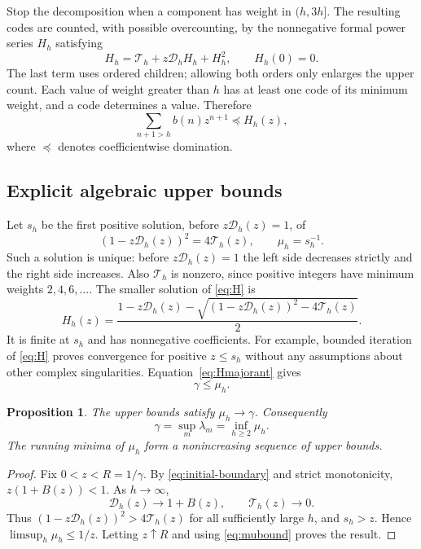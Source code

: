 \documentclass[11pt,letterpaper]{article}
\numberwithin{equation}{section}
\newtheorem{proposition}[theorem]{Proposition}
\theoremstyle{definition}
\begin{document}
Stop the decomposition when a component has weight in $(h,3h]$.
The resulting codes are counted, with possible overcounting, by the
nonnegative formal power series $H_h$ satisfying
\begin{equation}\label{eq:H}
 H_h=\mathcal T_h+z\mathcal D_hH_h+H_h^2,
 \qquad H_h(0)=0.
\end{equation}
The last term uses ordered children; allowing both orders only enlarges the
upper count. Each value of weight greater than $h$ has at least one code of
its minimum weight, and a code determines a value. Therefore
\begin{equation}\label{eq:Hmajorant}
 \sum_{n+1>h}b(n)z^{n+1}\preceq H_h(z),
\end{equation}
where $\preceq$ denotes coefficientwise domination.

\subsection{Explicit algebraic upper bounds}

Let $s_h$ be the first positive solution, before
$z\mathcal D_h(z)=1$, of
\begin{equation}\label{eq:sh}
 (1-z\mathcal D_h(z))^2=4\mathcal T_h(z),
 \qquad \mu_h=s_h^{-1}.
\end{equation}
Such a solution is unique: before $z\mathcal D_h(z)=1$ the left side decreases
strictly and the right side increases. Also $\mathcal T_h$ is nonzero, since
positive integers have minimum weights $2,4,6,\ldots$.
The smaller solution of \eqref{eq:H} is
\begin{equation}\label{eq:Hsolution}
 H_h(z)=\frac{1-z\mathcal D_h(z)
 -\sqrt{(1-z\mathcal D_h(z))^2-4\mathcal T_h(z)}}2.
\end{equation}
It is finite at $s_h$ and has nonnegative coefficients. For example, bounded
iteration of \eqref{eq:H} proves convergence for positive $z\le s_h$ without
any assumptions about other complex singularities.
Equation~\eqref{eq:Hmajorant} gives
\begin{equation}\label{eq:mubound}
 \gamma\le\mu_h.
\end{equation}

\begin{proposition}\label{prop:muconverges}
The upper bounds satisfy $\mu_h\to\gamma$. Consequently
\[
 \gamma=\sup_m\lambda_m=\inf_{h\ge2}\mu_h.
\]
The running minima of $\mu_h$ form a nonincreasing sequence of upper bounds.
\end{proposition}
\begin{proof}
Fix $0<z<R=1/\gamma$. By \eqref{eq:initial-boundary} and strict monotonicity,
$z(1+B(z))<1$. As $h\to\infty$,
\[
 \mathcal D_h(z)\longrightarrow1+B(z),\qquad
 \mathcal T_h(z)\longrightarrow0.
\]
Thus $(1-z\mathcal D_h(z))^2>4\mathcal T_h(z)$ for all sufficiently large
$h$, and $s_h>z$. Hence $\limsup_h\mu_h\le1/z$. Letting $z\uparrow R$ and
using \eqref{eq:mubound} proves the result.
\end{proof}
\end{document}
